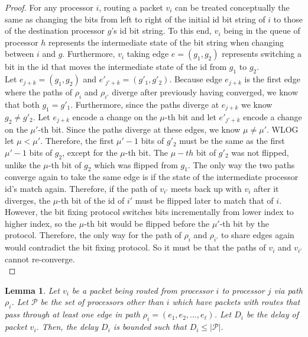 \documentclass[psamsfonts, 10pt]{amsart}
\newtheorem{lem}[thm]{Lemma}
\theoremstyle{definition}
\theoremstyle{remark}
\numberwithin{equation}{section}
\begin{document}
\begin{proof}
For any processor $i$, routing a packet $v_i$ can be treated conceptually the same as changing the bits from left to right of the initial id bit string of $i$ to those of the destination processor $g$'s id bit string. To this end, $v_i$ being in the queue of processor $h$ represents the intermediate state of the bit string when changing between $i$ and $g$. Furthermore, $v_i$ taking edge $e = (g_1, g_2)$ represents switching a bit in the id that moves the intermediate state of the id from $g_1$ to $g_2$.
\\

Let $e_{j +k} = (g_1, g_2)$ and $e'_{j' + k} = (g'_1, g'_2)$. Because edge $e_{j +k}$ is the first edge where the paths of $\rho_i$ and $\rho_{i'}$ diverge after previously  having converged, we know that both $g_1 = g'_1$.  Furthermore, since the paths diverge at $e_{j+k}$ we know $g_2 \neq g'_2$. Let $e_{j+k}$ encode  a change on the $\mu$-th bit and let $e'_{j' +k}$ encode a change on the $\mu'$-th bit. Since the paths diverge at these edges, we know $\mu \neq \mu'$. WLOG let $\mu <  \mu'$. Therefore, the first $\mu' -1$ bits of $g'_2$ must be the same as the first $\mu' -1$ bits of $g_2$, except for the $\mu$-th bit. The $\mu-th$ bit of $g'_2$ was not flipped, unlike the $\mu$-th bit of $g_2$ which was flipped from $g_1$. The only way the two paths converge again to take the same edge is if the state of the intermediate processor id's match again. Therefore, if the path of $v_{i'}$ meets back up with $v_i$ after it diverges, the $\mu$-th bit of the id of $i'$ must be flipped later to match that of $i$. However, the bit fixing protocol switches bits incrementally from lower index to higher index, so the $\mu$-th bit would be flipped before the $\mu'$-th bit by the protocol. Therefore, the only way for the path of $\rho_i$ and $\rho_{i'}$ to share edges  again would contradict the bit fixing protocol. So it must be that the paths of $v_i$ and $v_{i'}$  cannot re-converge. \\
\end{proof}
 
\begin{lem}
Let $v_i$ be a packet being routed from processor $i$ to processor $j$ via path $\rho_i$. Let $\mathcal{P}$ be the set of processors other than $i$ which have packets with routes that pass through at least one edge in path $\rho_i = (e_1, e_2, ..., e_{\ell})$. Let $D_i$ be the delay of packet $v_i$. Then, the delay $D_i$ is bounded such that $D_i \leq \lvert \mathcal{P} \rvert$.
\end{lem}
\end{document}
